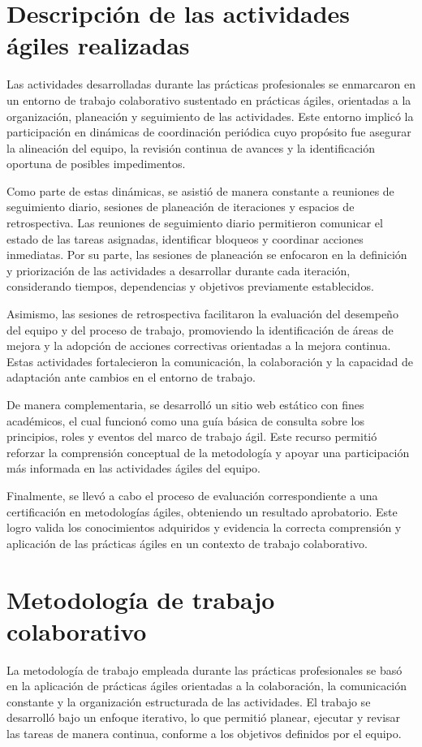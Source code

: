 \documentclass[12pt]{article}
\begin{document}
\section*{Descripción de las actividades ágiles realizadas}
Las actividades desarrolladas durante las prácticas profesionales se enmarcaron en un entorno de trabajo colaborativo sustentado en prácticas ágiles, orientadas a la organización, planeación y seguimiento de las actividades. Este entorno implicó la participación en dinámicas de coordinación periódica cuyo propósito fue asegurar la alineación del equipo, la revisión continua de avances y la identificación oportuna de posibles impedimentos.

Como parte de estas dinámicas, se asistió de manera constante a reuniones de seguimiento diario, sesiones de planeación de iteraciones y espacios de retrospectiva. Las reuniones de seguimiento diario permitieron comunicar el estado de las tareas asignadas, identificar bloqueos y coordinar acciones inmediatas. Por su parte, las sesiones de planeación se enfocaron en la definición y priorización de las actividades a desarrollar durante cada iteración, considerando tiempos, dependencias y objetivos previamente establecidos.

Asimismo, las sesiones de retrospectiva facilitaron la evaluación del desempeño del equipo y del proceso de trabajo, promoviendo la identificación de áreas de mejora y la adopción de acciones correctivas orientadas a la mejora continua. Estas actividades fortalecieron la comunicación, la colaboración y la capacidad de adaptación ante cambios en el entorno de trabajo.

De manera complementaria, se desarrolló un sitio web estático con fines académicos, el cual funcionó como una guía básica de consulta sobre los principios, roles y eventos del marco de trabajo ágil. Este recurso permitió reforzar la comprensión conceptual de la metodología y apoyar una participación más informada en las actividades ágiles del equipo.

Finalmente, se llevó a cabo el proceso de evaluación correspondiente a una certificación en metodologías ágiles, obteniendo un resultado aprobatorio. Este logro valida los conocimientos adquiridos y evidencia la correcta comprensión y aplicación de las prácticas ágiles en un contexto de trabajo colaborativo.


\section*{Metodología de trabajo colaborativo}
La metodología de trabajo empleada durante las prácticas profesionales se basó en la aplicación de prácticas ágiles orientadas a la colaboración, la comunicación constante y la organización estructurada de las actividades. El trabajo se desarrolló bajo un enfoque iterativo, lo que permitió planear, ejecutar y revisar las tareas de manera continua, conforme a los objetivos definidos por el equipo.
\end{document}
